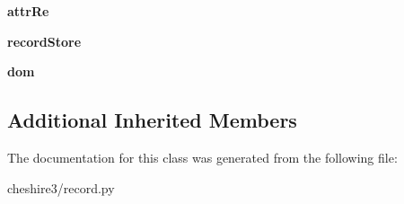 \begin{DoxyCompactItemize}
\item 
\hypertarget{classcheshire3_1_1record_1_1_sax_record_a14c03af08465482a487626faca41e541}{{\bfseries attr\-Re}}\label{classcheshire3_1_1record_1_1_sax_record_a14c03af08465482a487626faca41e541}

\item 
\hypertarget{classcheshire3_1_1record_1_1_sax_record_afc3558a51512224f64c669dfc070d7f6}{{\bfseries record\-Store}}\label{classcheshire3_1_1record_1_1_sax_record_afc3558a51512224f64c669dfc070d7f6}

\item 
\hypertarget{classcheshire3_1_1record_1_1_sax_record_acaef716ab3268408e53ceb7d9d025cdf}{{\bfseries dom}}\label{classcheshire3_1_1record_1_1_sax_record_acaef716ab3268408e53ceb7d9d025cdf}

\end{DoxyCompactItemize}
\subsection*{Additional Inherited Members}


The documentation for this class was generated from the following file\-:\begin{DoxyCompactItemize}
\item 
cheshire3/record.\-py\end{DoxyCompactItemize}
